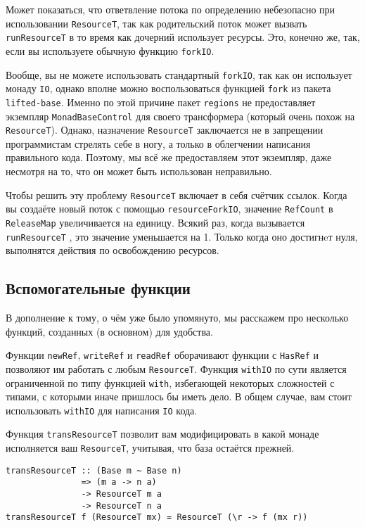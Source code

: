 Может показаться, что ответвление потока по определению небезопасно при использовании 
\lstinline'ResourceT', так как родительский поток может вызвать
\lstinline'runResourceT' в то время
как дочерний использует ресурсы. Это, конечно же, так, если вы используете обычную
функцию \lstinline'forkIO'.

\begin{remark}
Вообще, вы не можете использовать стандартный \lstinline'forkIO', так как он
использует монаду
\lstinline{IO}, однако вполне можно воспользоваться функцией \lstinline'fork' из пакета \lstinline{lifted-base}.
Именно по этой причине пакет \lstinline{regions} не предоставляет экземпляр \lstinline'MonadBaseControl' для своего
трансформера (который очень похож на \lstinline'ResourceT'). Однако, назначение
\lstinline'ResourceT' заключается не в запрещении 
программистам стрелять себе в ногу, а только в облегчении написания
правильного кода. Поэтому, мы всё же предоставляем этот экземпляр, даже несмотря на то, что он может быть
использован неправильно. 
\end{remark}

Чтобы решить эту проблему \lstinline'ResourceT' включает в себя
счётчик ссылок. Когда вы создаёте новый поток с помощью \lstinline'resourceForkIO',
значение \lstinline'RefCount' в \lstinline'ReleaseMap' увеличивается на единицу. Всякий раз, когда вызывается 
\lstinline'runResourceT'
, это значение уменьшается на 1. Только когда оно достигнeт нуля, выполнятся
действия по освобождению ресурсов.
 
\subsection{Вспомогательные функции}

В дополнение к тому, о чём уже было упомянуто, мы расскажем про несколько функций, созданных (в основном) для удобства.
   
Функции \verb=newRef=, \verb=writeRef= и \verb=readRef= оборачивают
функции с \lstinline'HasRef' и позволяют им работать с любым \lstinline'ResourceT'.
Функция \verb=withIO= по сути является ограниченной по типу функцией \verb=with=, избегающей некоторых сложностей с типами, с которыми иначе пришлось бы иметь дело.
В общем случае, вам стоит использовать \lstinline'withIO' для написания \lstinline{IO} кода.

Функция \verb=transResourceT= позволит вам модифицировать в какой монаде исполняется ваш
\verb=ResourceT=, учитывая, что база остаётся прежней.
\begin{lstlisting}
transResourceT :: (Base m ~ Base n)
               => (m a -> n a)
               -> ResourceT m a
               -> ResourceT n a
transResourceT f (ResourceT mx) = ResourceT (\r -> f (mx r))
\end{lstlisting}  

